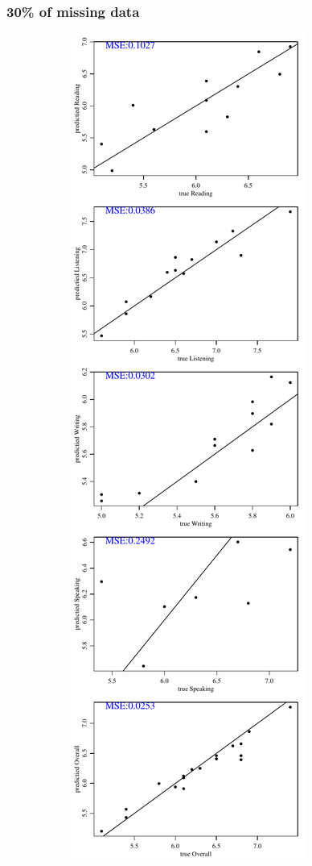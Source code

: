 \documentclass[12pt]{article}
\begin{document}
\subsubsection{30\% of missing data}
\begin{figure}[h!]
\centering
\begin{subfigure}{0.4\textwidth}
    \includegraphics[height=.85\textheight]{pic/0.30/EM_PredvsTrue.pdf}

\end{subfigure}
\end{figure}
\end{document}

